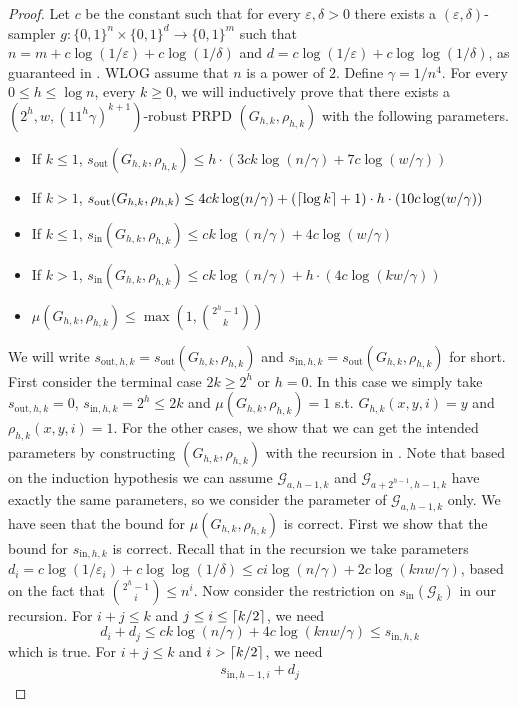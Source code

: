 \documentclass[10pt,a4paper]{article}
\DeclarePairedDelimiter\ceil{\lceil}{\rceil}
\newcommand{\cG}{\mathcal G}
\newcommand{\bits}[1]{\{0,1\}^{#1}}
\newcommand{\eps}{\varepsilon}
\newcommand{\wt}{\mu}
\newcommand{\sout}[1][]{s_{\mathrm{out}#1}}
\newcommand{\si}[1][]{s_{\mathrm{in}#1}}
\begin{document}
\begin{proof}
Let $c$ be the constant such that for every $\eps,\delta>0$ there exists a $(\eps,\delta)$-sampler $g:\bits{n}\times\bits{d}\to\bits{m}$ such that $n=m+c\log(1/\eps)+c\log(1/\delta)$ and $d=c\log (1/\eps)+c\log\log(1/\delta)$, as guaranteed in . WLOG assume that $n$ is a power of $2$. Define $\gamma=1/n^{4}$. For every $0\le h \le \log n$, every $k\ge 0$, we will inductively prove that there exists a $(2^h,w,(11^h\gamma)^{k+1})$-robust PRPD $(G_{h,k},\rho_{h,k})$ with the following parameters.
\begin{itemize}
\item
If $k\le 1$, $\sout(G_{h,k},\rho_{h,k})\le h \cdot (3ck\log(n/\gamma) + 7c\log(w/\gamma))$
\item 
If $k>1$, $\sout(G_{h,k},\rho_{h,k})\le 4ck\log (n/\gamma)+(\ceil{\log k}+1)\cdot h \cdot (10c\log(w/\gamma))$
\item
If $k\le 1$, $\si(G_{h,k},\rho_{h,k})\le ck\log(n/\gamma) + 4c\log(w/\gamma)$
\item
If $k>1$, $\si(G_{h,k},\rho_{h,k})\le ck\log (n/\gamma)+ h \cdot (4c\log(kw/\gamma))$
\item
$\wt(G_{h,k},\rho_{h,k})\le \max(1,\binom{2^h-1}{k})$
\end{itemize}
We will write $\sout[,h,k]=\sout(G_{h,k},\rho_{h,k})$ and $\si[,h,k]=\sout(G_{h,k},\rho_{h,k})$ for short. First consider the terminal case $2k\ge 2^h$ or $h=0$. In this case we simply take $\sout[,h,k]=0$, $\si[,h,k]=2^h \le 2k$ and $\wt(G_{h,k},\rho_{h,k})=1$ s.t. $G_{h,k}(x,y,i)=y$ and $\rho_{h,k}(x,y,i)=1$. For the other cases, we show that we can get the intended parameters by constructing $(G_{h,k},\rho_{h,k})$ with the recursion in . Note that based on the induction hypothesis we can assume $\cG_{a,h-1,k}$ and $\cG_{a+2^{h-1},h-1,k}$ have exactly the same parameters, so we consider the parameter of $\cG_{a,h-1,k}$ only. We have seen that the bound for $\wt(G_{h,k},\rho_{h,k})$ is correct. First we show that the bound for $\si[,h,k]$ is correct. Recall that in the recursion we take parameters $d_i=c\log(1/\eps_i)+c\log\log(1/\delta)\le ci\log(n/\gamma)+2c\log(knw/\gamma)$, based on the fact that $\binom{2^h-1}{i}\le n^i$. Now consider the restriction on $\si(\cG_k)$ in our recursion. For $i+j\le k$ and $j\le i\le\ceil{k/2}$, we need 
$$d_i+d_j\le ck\log(n/\gamma)+4c\log(knw/\gamma)\le\si[,h,k]$$ which is true. For $i+j\le k$ and $i>\ceil{k/2}$, we need 
\begin{align*}
\si[,h-1,i]+d_j

\end{align*}
\end{proof}
\end{document}
